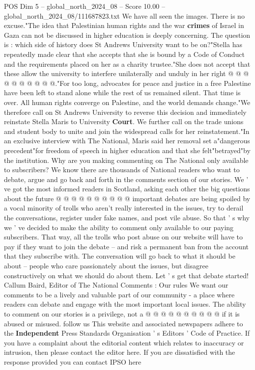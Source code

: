 \begin{textsample}{POS Dim 5 – global\_north\_2024\_08 – Score 10.00 – global\_north\_2024\_08/111687823.txt}
We have all seen the images.
There is no excuse."The idea that Palestinian human rights and the war \textbf{crimes} of Israel in Gaza can not be discussed in higher education is deeply concerning.
The question is : which side of history does St Andrews University want to be on?"Stella has repeatedly made clear that she accepts that she is bound by a Code of Conduct and the requirements placed on her as a charity trustee."She does not accept that these allow the university to interfere unilaterally and unduly in her right @ @ @ @ @ @ @ @ @ @."For too long, advocates for peace and justice in a free Palestine have been left to stand alone while the rest of us remained silent.
That time is over.
All human rights converge on Palestine, and the world demands change."We therefore call on St Andrews University to reverse this decision and immediately reinstate Stella Maris to University \textbf{Court}.
We further call on the trade unions and student body to unite and join the widespread calls for her reinstatement."In an exclusive interview with The National, Maris said her removal set a"dangerous precedent"for freedom of speech in higher education and that she felt"betrayed"by the institution.
Why are you making commenting on The National only available to subscribers?
We know there are thousands of National readers who want to debate, argue and go back and forth in the comments section of our stories.
We ' ve got the most informed readers in Scotland, asking each other the big questions about the future @ @ @ @ @ @ @ @ @ @ important debates are being spoiled by a vocal minority of trolls who aren't really interested in the issues, try to derail the conversations, register under fake names, and post vile abuse.
So that ' s why we ' ve decided to make the ability to comment only available to our paying subscribers.
That way, all the trolls who post abuse on our website will have to pay if they want to join the debate -- and risk a permanent ban from the account that they subscribe with.
The conversation will go back to what it should be about -- people who care passionately about the issues, but disagree constructively on what we should do about them.
Let ' s get that debate started!
Callum Baird, Editor of The National Comments : Our rules We want our comments to be a lively and valuable part of our community - a place where readers can debate and engage with the most important local issues.
The ability to comment on our stories is a privilege, not a @ @ @ @ @ @ @ @ @ @ if it is abused or misused. follow us This website and associated newspapers adhere to the \textbf{Independent} Press Standards Organisation ' s Editors ' Code of Practice.
If you have a complaint about the editorial content which relates to inaccuracy or intrusion, then please contact the editor here.
If you are dissatisfied with the response provided you can contact IPSO here

\end{textsample}
